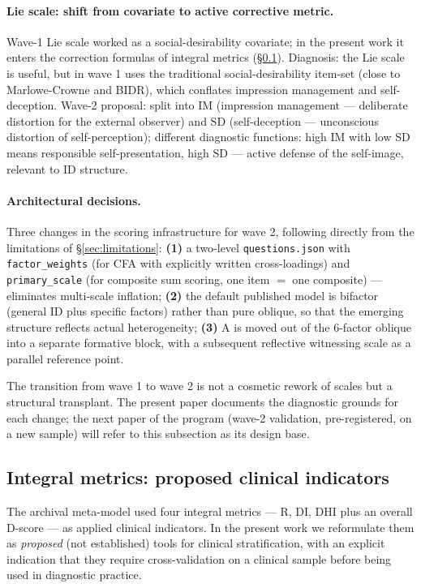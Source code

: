 \paragraph{Lie scale: shift from covariate to active corrective metric.} Wave-1 Lie scale worked as a social-desirability covariate; in the present work it enters the correction formulas of integral metrics (§\ref{subsec:integral_metrics}). Diagnosis: the Lie scale is useful, but in wave 1 uses the traditional social-desirability item-set (close to Marlowe-Crowne and BIDR), which conflates impression management and self-deception. Wave-2 proposal: split into IM (impression management --- deliberate distortion for the external observer) and SD (self-deception --- unconscious distortion of self-perception); different diagnostic functions: high IM with low SD means responsible self-presentation, high SD --- active defense of the self-image, relevant to ID structure.

\paragraph{Architectural decisions.} Three changes in the scoring infrastructure for wave 2, following directly from the limitations of §\ref{sec:limitations}: \textbf{(1)} a two-level \texttt{questions.json} with \texttt{factor\_weights} (for CFA with explicitly written cross-loadings) and \texttt{primary\_scale} (for composite sum scoring, one item $=$ one composite) --- eliminates multi-scale inflation; \textbf{(2)} the default published model is bifactor (general ID plus specific factors) rather than pure oblique, so that the emerging structure reflects actual heterogeneity; \textbf{(3)} A is moved out of the 6-factor oblique into a separate formative block, with a subsequent reflective witnessing scale as a parallel reference point.

The transition from wave 1 to wave 2 is not a cosmetic rework of scales but a structural transplant. The present paper documents the diagnostic grounds for each change; the next paper of the program (wave-2 validation, pre-registered, on a new sample) will refer to this subsection as its design base.

\subsection{Integral metrics: proposed clinical indicators}
\label{subsec:integral_metrics}

The archival  meta-model used four integral metrics --- R, DI, DHI plus an overall D-score --- as applied clinical indicators. In the present work we reformulate them as \emph{proposed} (not established) tools for clinical stratification, with an explicit indication that they require cross-validation on a clinical sample before being used in diagnostic practice.

